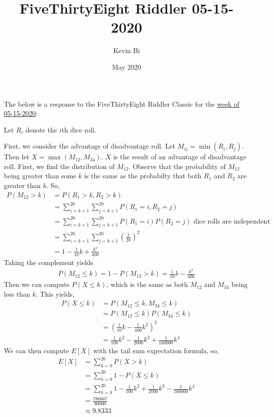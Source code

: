 \documentclass{article}
\title{FiveThirtyEight Riddler 05-15-2020}
\author{Kevin Bi}
\date{May 2020}
\begin{document}
\maketitle
The below is a response to the FiveThirtyEight Riddler Classic for the \href{https://fivethirtyeight.com/features/can-you-find-the-best-dungeons-dragons-strategy/}{week of 05-15-2020}:

Let $R_i$ denote the $i$th dice roll. 

First, we consider the advantage of disadvantage roll. Let $M_{ij} = \min(R_i, R_j)$. Then let $X = \max(M_{12}, M_{34})$. $X$ is the result of an advantage of disadvantage roll. First, we find the distribution of $M_{12}$. Observe that the probability of $M_{12}$ being greater than some $k$ is the same as the probabilty that both $R_1$ and $R_2$ are greater than $k$. So,
\begin{align*}
    P(M_{12} > k) &= P(R_1 > k, R_2 > k) \\
    &= \sum_{i = k + 1}^{20} \sum_{j = k + 1}^{20} P(R_1 = i, R_2 = j) \\
    &= \sum_{i = k + 1}^{20} \sum_{j = k + 1}^{20} P(R_1 = i)P(R_2 = j) \text{ dice rolls are independent} \\
    &= \sum_{i = k + 1}^{20} \sum_{j = k + 1}^{20} \left(\frac{1}{20}\right)^2 \\
    &= 1 - \frac{1}{10} k + \frac{k^2}{400}
\end{align*}
Taking the complement yields
\begin{align*}
    P(M_{12} \leq k) = 1 - P(M_{12} > k) =  \frac{1}{10}k - \frac{k^2}{400}
\end{align*}
Then we can compute $P(X \leq k)$, which is the same as both $M_{12}$ and $M_{34}$ being less than $k$. This yields,
\begin{align*}
    P(X \leq k) &= P(M_{12} \leq k, M_{34} \leq k) \\
    &= P(M_{12} \leq k) P(M_{34} \leq k) \\
    &= \left(\frac{1}{10} k - \frac{1}{400} k^2\right)^2 \\
    &= \frac{1}{100} k^2 - \frac{1}{2000} k^3 + \frac{1}{160000} k^4
\end{align*}   
We can then compute $E[X]$ with the tail sum expectation formula, so,
\begin{align*}
    E[X] &= \sum_{k = 0}^{20} P(X > k) \\
    &= \sum_{k = 0}^{20} 1 - P(X \leq k) \\
    &= \sum_{k = 0}^{20} 1 - \frac{1}{100} k^2 + \frac{1}{2000} k^3 - \frac{1}{160000} k^4 \\
    &= \frac{786667}{80000} \\
    &\approx 9.8333
\end{align*}
\end{document}
